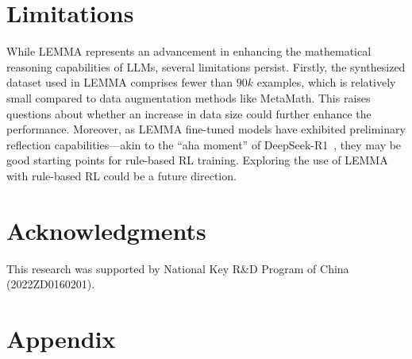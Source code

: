 \documentclass[11pt]{article}
\begin{document}
\section*{Limitations}
While LEMMA represents an advancement in enhancing the mathematical reasoning capabilities of LLMs, several limitations persist. 
Firstly, the synthesized dataset used in LEMMA comprises fewer than $90k$ examples, which is relatively small compared to data augmentation methods like MetaMath. This raises questions about whether an increase in data size could further enhance the performance. 
Moreover, as LEMMA fine-tuned models have exhibited preliminary reflection capabilities—akin to the ``aha moment'' of DeepSeek-R1~\cite{guo2025deepseek}, they may be good starting points for rule-based RL training. Exploring the use of LEMMA with rule-based RL could be a future direction.

\section*{Acknowledgments}

This research was supported by National Key R\&D Program of China (2022ZD0160201).


% 

\appendix

\section{Appendix}
\label{sec:appendix}

\end{document}
